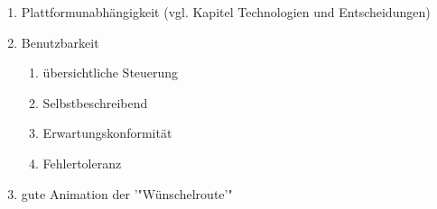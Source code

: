 \begin{enumerate}
	\begin{enumerate}
		\item Plattformunabhängigkeit (vgl. Kapitel Technologien und Entscheidungen)
		\item Benutzbarkeit
		\begin{enumerate}
			\item übersichtliche Steuerung
			\item Selbstbeschreibend
			\item Erwartungskonformität
			\item Fehlertoleranz
		\end{enumerate}
		\item gute Animation der '"Wünschelroute'"
	\end{enumerate}
\end{enumerate}
